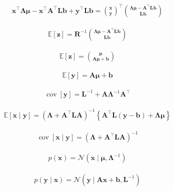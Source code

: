 \documentclass{article}
\begin{document}
\begin{align*}
\mathbf{x}^{\top} \boldsymbol{\Lambda} \boldsymbol{\mu}-\mathbf{x}^{\top} \mathbf{A}^{\top} \mathbf{L} \mathbf{b}+\mathbf{y}^{\top} \mathbf{L} \mathbf{b}=\binom{\mathbf{x}}{\mathbf{y}}^{\top}\binom{\boldsymbol{\Lambda} \boldsymbol{\mu}-\mathbf{A}^{\top} \mathbf{L} \mathbf{b}}{\mathbf{L} \mathbf{b}}
\tag{3.90}
\end{align*}

\begin{align*}
\mathbb{E}[\mathbf{z}] = \mathbf{R}^{-1} \binom{\boldsymbol{\Lambda} \boldsymbol{\mu} - \mathbf{A}^{\top} \mathbf{L} \mathbf{b}}{\mathbf{L} \mathbf{b}}
\tag{3.91}
\end{align*}

\begin{align*}
\mathbb{E}[\mathbf{z}] = \binom{\boldsymbol{\mu}}{\mathbf{A} \boldsymbol{\mu} + \mathbf{b}}
\tag{3.92}
\end{align*}

\begin{align*}
\mathbb{E}[\mathbf{y}] = \mathbf{A} \boldsymbol{\mu} + \mathbf{b}
\tag{3.93}
\end{align*}

\begin{align*}
\operatorname{cov}[\mathbf{y}] = \mathbf{L}^{-1} + \mathbf{A} \boldsymbol{\Lambda}^{-1} \mathbf{A}^{\top}
\tag{3.94}
\end{align*}

\begin{align*}
\mathbb{E}[\mathbf{x} \mid \mathbf{y}] = \left(\boldsymbol{\Lambda} + \mathbf{A}^{\top} \mathbf{L} \mathbf{A}\right)^{-1} \left\{\mathbf{A}^{\top} \mathbf{L} (\mathbf{y} - \mathbf{b}) + \boldsymbol{\Lambda} \boldsymbol{\mu}\right\}
\tag{3.95}
\end{align*}

\begin{align*}
\operatorname{cov}[\mathbf{x} \mid \mathbf{y}] = \left(\boldsymbol{\Lambda} + \mathbf{A}^{\top} \mathbf{L} \mathbf{A}\right)^{-1}
\tag{3.96}
\end{align*}

\begin{align*}
p(\mathbf{x}) =\mathcal{N}\left(\mathbf{x} \mid \boldsymbol{\mu}, \boldsymbol{\Lambda}^{-1}\right)
\tag{3.97}
\end{align*}

\begin{align*}
p(\mathbf{y} \mid \mathbf{x}) = \mathcal{N}\left(\mathbf{y} \mid \mathbf{A} \mathbf{x}+\mathbf{b}, \mathbf{L}^{-1}\right)
\tag{3.98}
\end{align*}
\end{document}
